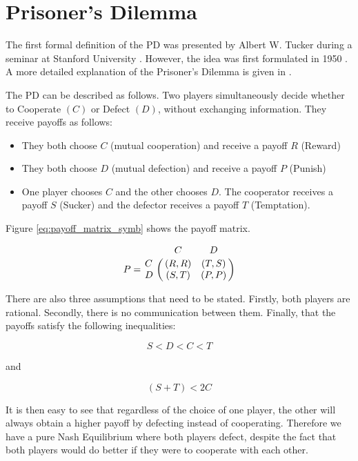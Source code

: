 \section{Prisoner's Dilemma}\label{sec:intro_pd}

The first formal definition of the PD was presented by Albert W. Tucker during a seminar at Stanford University \cite{Gass2005}.
However, the idea was first formulated in 1950 \cite{Flood1958}.
A more detailed explanation of the Prisoner's Dilemma is given in \cite{Gotts2003}.

The PD can be described as follows. Two players simultaneously decide whether to Cooperate $(C)$ or Defect $(D)$, without exchanging information.
They receive payoffs as follows:

\begin{itemize}
    \item They both choose $C$ (mutual cooperation) and receive a payoff $R$ (Reward)
    \item They both choose $D$ (mutual defection) and receive a payoff $P$ (Punish)
    \item One player chooses $C$ and the other chooses $D$. The cooperator receives a payoff $S$ (Sucker) and the defector receives a payoff $T$ (Temptation).
\end{itemize}

Figure \ref{eq:payoff_matrix_symb} shows the payoff matrix.

\begin{equation}\label{eq:payoff_matrix_symb}
%
P = \bordermatrix{~ & C & D \cr
                  C & (R, R) & (T, S) \cr
                  D & (S, T) & (P, P) \cr}
%
\end{equation}

There are also three assumptions that need to be stated.
Firstly, both players are rational.
Secondly, there is no communication between them.
Finally, that the payoffs satisfy the following inequalities:

\begin{equation}\label{eq:intuitive}
S < D < C < T
\end{equation}

and

\begin{equation}\label{eq:ensure_coop}
(S + T) < 2 C
\end{equation}

It is then easy to see that regardless of the choice of one player, the other will always obtain a higher payoff by defecting instead of cooperating.
Therefore we have a pure Nash Equilibrium where both players defect, despite the fact that both players would do better if they were to cooperate with each other.

